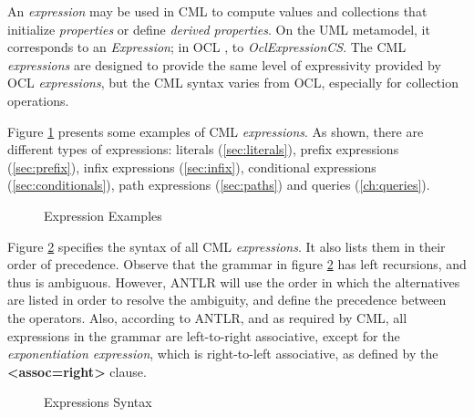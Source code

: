 \begin{definition}
An \emph{expression} may be used in CML to compute values and collections that initialize \emph{properties} or define \emph{derived properties}.
On the UML \cite{uml} metamodel,
it corresponds to an \emph{Expression};
in OCL \cite{ocl}, to \emph{OclExpressionCS}.
The CML \emph{expressions} are designed to provide the same level of
expressivity provided by OCL \emph{expressions},
but the CML syntax varies from OCL, especially for collection operations.
\end{definition}

\begin{examples}
Figure \ref{fig:ex:expressions} presents some examples of CML \emph{expressions}.
As shown, there are different types of expressions:
literals (\ref{sec:literals}),
prefix expressions (\ref{sec:prefix}),
infix expressions (\ref{sec:infix}),
conditional expressions (\ref{sec:conditionals}),
path expressions (\ref{sec:paths})
and queries (\ref{ch:queries}).
\end{examples}

\begin{figure}
\verbatimfont{\small}
\begin{framed}

\end{framed}
\caption{Expression Examples}
\label{fig:ex:expressions}
\end{figure}

\begin{concrete-syntax}
Figure \ref{fig:stx:expressions} specifies the syntax of all CML \emph{expressions}. It also lists them in their order of precedence.
Observe that the grammar in figure \ref{fig:stx:expressions} has left
recursions, and thus is ambiguous.
However, ANTLR \cite{antlr} will use the order in which the alternatives
are listed in order to resolve the ambiguity,
and define the precedence between the operators.
Also, according to ANTLR,
and as required by CML,
all expressions in the grammar are left-to-right associative,
except for the \emph{exponentiation expression},
which is right-to-left associative,
as defined by the \textbf{<assoc=right>} clause.
\end{concrete-syntax}

\begin{figure}
\verbatimfont{\small}
\begin{framed}

\end{framed}
\caption{Expressions Syntax}
\label{fig:stx:expressions}
\end{figure}
